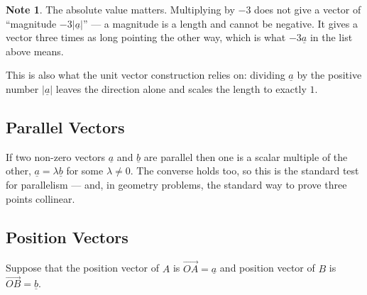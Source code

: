 \documentclass[11pt,a4paper]{article}
\theoremstyle{definition}
\newtheorem{note}[thm]{Note}
\begin{document}
\begin{note}
The absolute value matters. Multiplying by $-3$ does not give a vector of
``magnitude $-3\left|\underline{a}\right|$'' --- a magnitude is a length and cannot be
negative. It gives a vector three times as long pointing the other way, which is
what $-3\underline{a}$ in the list above means.

This is also what the unit vector construction relies on: dividing
$\underline{a}$ by the positive number $\left|\underline{a}\right|$ leaves the
direction alone and scales the length to exactly $1$.
\end{note}





\subsection{Parallel Vectors}
If two non-zero vectors $\underline{a}$ and $\underline{b}$ are parallel then one
is a scalar multiple of the other, $\underline{a}=\lambda\underline{b}$ for some
$\lambda\neq 0$. The converse holds too, so this is the standard test for
parallelism --- and, in geometry problems, the standard way to prove three points
collinear.

\begin{figure}[H]
\centering
{}
\end{figure}













\vspace{1cm}
\subsection{Position Vectors}
Suppose that the position vector of $A$ is $\overrightarrow{OA} = \underline{a}$ and position vector of $B$ is $\overrightarrow{OB} = \underline{b}$.
\end{document}
